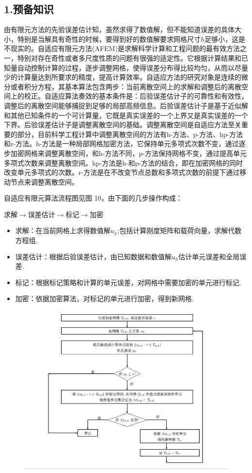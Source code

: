 \documentclass{article}
\begin{document}
\subsection{1.预备知识}
由有限元方法的先验误差估计知，虽然求得了数值解，但不能知道误差的具体大小，特别是当解具有奇性的时候，要得到好的数值解要求网格尺寸$h$足够小，这是不现实的。自适应有限元方法(AFEM)是求解科学计算和工程问题的最有效方法之一，特别对存在奇性或者多尺度性质的问题有很强的适定性。它根据计算结果和已知量自动控制计算的过程，逐步调整网格，使得误差分布得比较均匀，从而以尽量少的计算量达到所要求的精度，提高计算效率。自适应方法的研究对象是连续的微分或者积分方程，其基本算法包含两步：当前离散空间上的求解和调整后的离散空间上的校正。自适应算法奏效的基本条件是：后验误差估计子的可靠性和有效性，调整后的离散空间能够捕捉到足够的局部高频信息。后验误差估计子是基于近似解和其他已知条件的一个可计算量，它既是真实误差的一个上界又是真实误差的一个下界。后验误差估计子是调整离散空间的基础。调整离散空间是自适应方法至关重要的部分，目前科学工程计算中调整离散空间的方法有h-方法、p-方法、hp-方法和r-方法。h-方法是一种局部网格加密方法，它保持单元多项式次数不变，通过逐步加密网格来调整离散空间，和h-方法不同，p-方法保持网格不变，通过提高单元多项式次数来调整离散空间。hp-方法是h-和p-方法的结合，即在加密网格的同时改变单元多项式的次数。r-方法是在不改变节点总数和多项式次数的前提下通过移动节点来调整离散空间。

自适应有限元算法流程图见图 10，由下面的几步操作构成：
\begin{center}
求解$\rightarrow$误差估计$\rightarrow$标记$\rightarrow$加密
\end{center}
\begin{itemize} 
\item 求解：在当前网格上求得数值解$u_h$;包括计算刚度矩阵和载荷向量，求解代数方程组.
\item 误差估计：根据后验误差估计，由已知数据和数值解$u_h$估计单元误差和全局误差.
\item 标记：根据标记策略和计算的单元误差，对网格中需要加密的单元进行标记.
\item 加密：依据加密算法，对标记的单元进行加密，得到新网格.
\end{itemize}
\begin{figure}[H]
\centering
\includegraphics[scale=0.6]{./figures/Figure_13.png}
\caption{}
\end{figure}
\end{document}

